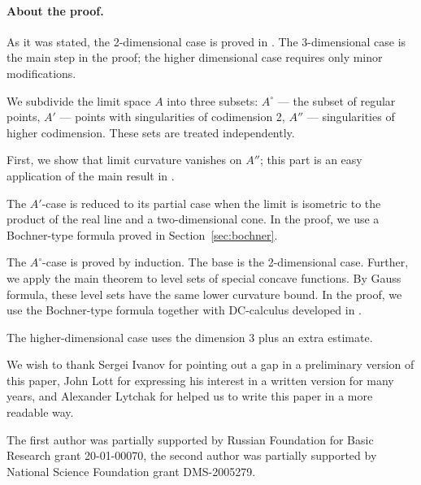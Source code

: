 \paragraph{About the proof.}
As it was stated, the 2-dimensional case is proved in \cite[VII \S13]{AZ}.
The 3-dimensional case is the main step in the proof;
the higher dimensional case requires only minor modifications.

We subdivide the limit space $A$ into
three subsets: $A^\circ$ --- the subset of regular 
points, $A'$ --- points with singularities of codimension 2,
$A''$ --- singularities of higher codimension.
These sets are treated independently.

First, we show that limit curvature vanishes on $A''$; 
this part is an easy application of the main result in \cite{petrunin-SC}.

The $A'$-case is reduced to its partial case when the limit is isometric to the product of the real line and a two-dimensional cone.
In the proof, we use a Bochner-type formula proved in Section~\ref{sec:bochner}.

The $A^\circ$-case is proved by induction.
The base is the 2-dimensional case.
Further, we apply the main theorem to level sets of special concave functions.
By Gauss formula, these level sets have the same lower curvature bound. 
In the proof, we use the Bochner-type formula together with DC-calculus developed in \cite{PerDC}.

The higher-dimensional case uses the dimension 3 plus an extra estimate.

We wish to thank Sergei Ivanov for pointing out a gap in a preliminary version of this paper,
John Lott for expressing his interest in a written version for many years,
and Alexander Lytchak for helped us to write this paper in a more readable way.

The first author was partially supported by Russian Foundation for Basic Research grant 20-01-00070, 
the second author was partially supported by National Science Foundation grant DMS-2005279.

